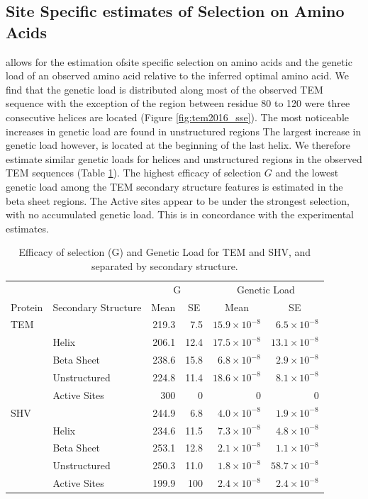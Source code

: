 \documentclass[12pt]{article}
\begin{document}
\subsection*{Site Specific estimates of Selection on Amino Acids}
\selac allows for the estimation ofsite specific selection on amino acids and the genetic load of an observed amino acid relative to the inferred optimal amino acid.
We find that the genetic load is distributed along most of the observed TEM sequence with the exception of the region between residue 80 to 120 were three consecutive helices are located (Figure \ref{fig:tem2016_sse}). 
The most noticeable increases in genetic load are found in unstructured regions
The largest increase in genetic load however, is located at the beginning of the last helix.
We therefore estimate similar genetic loads for helices and unstructured regions in the observed TEM sequences (Table \ref{tab:selection}).
The highest efficacy of selection $G$ and the lowest genetic load among the TEM secondary structure features is estimated in the beta sheet regions.
The Active sites appear to be under the strongest selection, with no accumulated genetic load.
This is in concordance with the experimental estimates.

\begin{table}
  \centering
  \begin{tabular}{llrrrr}
    & & \multicolumn{2}{c}{G} & \multicolumn{2}{c}{Genetic Load} \\ 
    Protein & Secondary Structure	& \multicolumn{1}{c}{Mean} & \multicolumn{1}{c}{SE} & \multicolumn{1}{c}{Mean} & \multicolumn{1}{c}{SE} \\ \hline 
    TEM	&		& 219.3 & 7.5  & $15.9\times10^{-8}$ & $6.5\times10^{-8}$ \\
    &Helix 		& 206.1 & 12.4 & $17.5\times10^{-8}$ & $13.1\times10^{-8}$ \\
    &Beta Sheet 	& 238.6 & 15.8 & $ 6.8\times10^{-8}$ & $2.9\times10^{-8}$ \\
    &Unstructured 	& 224.8 & 11.4 & $18.6\times10^{-8}$ & $8.1\times10^{-8}$ \\
    &Active Sites 	& 300   & 0    & 0      & 0      \\ \hline
    
    SHV&		& 244.9 & 6.8  & $4.0\times10^{-8}$ & $1.9\times10^{-8}$ \\
    &Helix		& 234.6 & 11.5 & $7.3\times10^{-8}$ & $4.8\times10^{-8}$ \\
    &Beta Sheet 	& 253.1 & 12.8 & $2.1\times10^{-8}$ & $1.1\times10^{-8}$ \\
    &Unstructured	& 250.3 & 11.0 & $1.8\times10^{-8}$ & $58.7\times10^{-8}$  \\
    &Active Sites	& 199.9 & 100  & $2.4\times10^{-8}$ & $2.4\times10^{-8}$ \\

  \end{tabular}
  \caption{Efficacy of selection (G) and Genetic Load for TEM and SHV, and separated by secondary structure.}
  \label{tab:selection}
\end{table}
\end{document}
